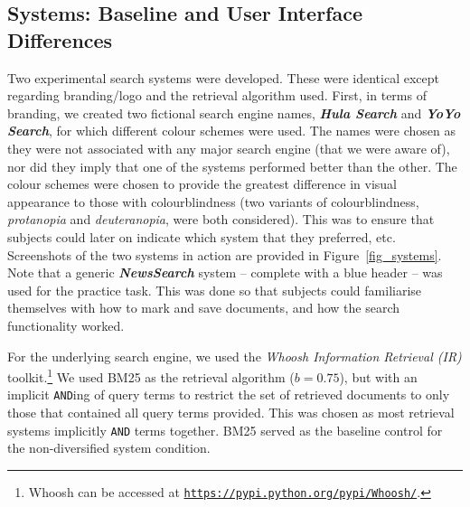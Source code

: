 \subsection{Systems: Baseline and User Interface Differences}\label{sec:method:systems}
Two experimental search systems were developed. These were identical except regarding branding/logo and the retrieval algorithm used. First, in terms of branding, we created two fictional search engine names,
\textbf{\emph{Hula Search}} and \textbf{\emph{YoYo Search}}, for which different colour schemes were used. The names were chosen as they were not associated with any major search engine (that we were aware of), nor did they imply that one of the systems performed better than the other. The colour schemes were chosen to provide the greatest difference in visual appearance to those with colourblindness (two variants of colourblindness, \emph{protanopia} and \emph{deuteranopia}, were both considered). This was to ensure that subjects could later on indicate which system that they preferred, etc. Screenshots of the two systems in action are provided in Figure~\ref{fig_systems}. 
Note that a generic \textbf{\emph{NewsSearch}} system -- complete with a blue header -- was used for the practice task. This was done so that subjects could familiarise themselves with how to mark and save documents, and how the search functionality worked.

For the underlying search engine, we used the \emph{Whoosh Information Retrieval (IR)} toolkit.\footnote{Whoosh can be accessed at \texttt{\url{https://pypi.python.org/pypi/Whoosh/}}.} We used BM25 as the retrieval algorithm ($b=0.75$), but with an implicit \texttt{AND}ing of query terms to restrict the set of retrieved documents to only those that contained all query terms provided. This was chosen as most retrieval systems implicitly \texttt{AND} terms together. BM25 served as the baseline control for the non-diversified system condition.


